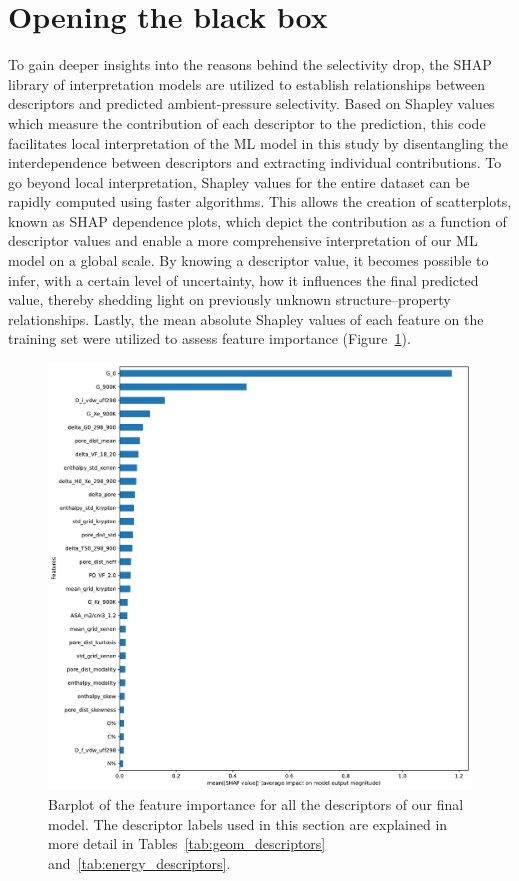 \documentclass[main]{subfiles}
\begin{document}
\section{Opening the black box}

To gain deeper insights into the reasons behind the selectivity drop, the SHAP library of interpretation models\autocite{SHAP,molnar2020interpretable} are utilized to establish relationships between descriptors and predicted ambient-pressure selectivity. Based on Shapley values\autocite{shapley1953value} which measure the contribution of each descriptor to the prediction, this code facilitates local interpretation of the ML model in this study by disentangling the interdependence between descriptors and extracting individual contributions. To go beyond local interpretation, Shapley values for the entire dataset can be rapidly computed using faster algorithms.\autocite{SHAP} This allows the creation of scatterplots, known as SHAP dependence plots, which depict the contribution as a function of descriptor values and enable a more comprehensive interpretation of our ML model on a global scale. By knowing a descriptor value, it becomes possible to infer, with a certain level of uncertainty, how it influences the final predicted value, thereby shedding light on previously unknown structure--property relationships. Lastly, the mean absolute Shapley values of each feature on the training set were utilized to assess feature importance (Figure~\ref{fgr:featimp_shap}).

\begin{figure}[ht]
  \centering
    \includegraphics[width=0.70\linewidth]{figures/4-ml/SI_figure/Feature_importance_shapbased.pdf}
    \caption{Barplot of the feature importance for all the descriptors of our final model. The descriptor labels used in this section are explained in more detail in Tables~\ref{tab:geom_descriptors} and~\ref{tab:energy_descriptors}.}\label{fgr:featimp_shap}
  \end{figure}
\end{document}
